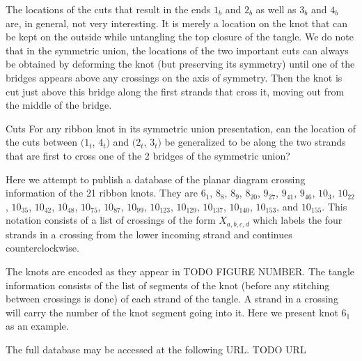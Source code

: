 \begin{paper}
The locations of the cuts that result in the ends $1_b$ and $2_b$ as well as
$3_b$ and $4_b$ are, in general, not very interesting.
It is merely a location on the knot that can be kept on the outside while
untangling the top closure of the tangle.
We do note that in the symmetric union, the locations of the two important cuts
can always be obtained by deforming the knot (but preserving its symmetry) until
one of the bridges appears above any crossings on the axis of symmetry.
Then the knot is cut just above this bridge along the first strands that cross
it, moving out from the middle of the bridge.

\newsavebox{\mirrorR}


\begin{paperquestion}{Cuts}
For any ribbon knot in its symmetric union presentation, can the location of the
cuts between $(1_t$, $4_t)$ and $(2_t$, $3_t)$ be generalized to be along the
two strands that are first to cross one of the 2 bridges of the symmetric union?
\end{paperquestion}
Here we attempt to publish a database of the planar diagram crossing information
of the 21 ribbon knots.
They are $6_1$, $8_8$, $8_9$, $8_{20}$, $9_{27}$, $9_{41}$, $9_{46}$, $10_3$,
$10_{22}$, $10_{35}$, $10_{42}$, $10_{48}$, $10_{75}$, $10_{87}$, $10_{99}$,
$10_{123}$, $10_{129}$, $10_{137}$, $10_{140}$, $10_{153}$, and $10_{155}$.
This notation consists of a list of crossings of the form $X_{a,b,c,d}$ which
labels the four strands in a crossing from the lower incoming strand and
continues counterclockwise.


The knots are encoded as they appear in TODO FIGURE NUMBER.
The tangle information consists of the list of segments of the knot (before any
stitching between crossings is done) of each strand of the tangle.
A strand in a crossing will carry the number of the knot segment going into it.
Here we present knot $6_1$ as an example.


The full database may be accessed at the following URL.
TODO URL
\end{paper}

